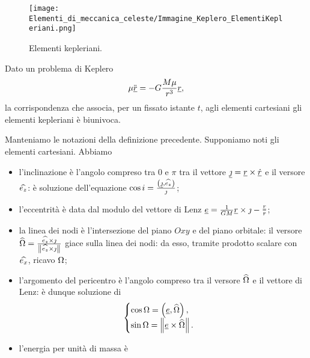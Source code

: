 \begin{figure}
	\texttt{[image: Elementi\_di\_meccanica\_celeste/Immagine\_Keplero\_ElementiKepleriani.png]}
	\centering
	\caption{Elementi kepleriani.}
\end{figure}
\begin{Theorem}
  Dato un problema di Keplero
	\[
		\mu \ddot{\underline{r}}
    = - G \frac{M\mu}{r^3}\underline{r},
	\]
  la corrispondenza che associa, per un fissato istante $t$, agli
  elementi cartesiani gli elementi kepleriani \`e biunivoca.
\end{Theorem}
\Proof Manteniamo le notazioni della definizione precedente.
Supponiamo noti gli elementi cartesiani.
Abbiamo
\begin{itemize}
  \item l'inclinazione \`e l'angolo compreso tra $0$ e $\pi$ tra il
    vettore
    $\underline{\jmath}
      = \underline{r} \times \underline{\dot{r}}$ e il versore
    $\widehat{e_z}$: \`e soluzione dell'equazione
    $\cos{i}
      =\frac{\left ( \underline{\jmath} , \widehat{e_z} \right )}
        {\jmath}$;
  \item l'eccentrit\`a \`e data dal modulo del vettore di Lenz
    $\underline{e}
      = \frac{1}
        {GM}
        \underline{r} \times \jmath
        - \frac{\underline{r}}{r}$;
  \item la linea dei nodi \`e l'intersezione del piano $Oxy$ e del piano
    orbitale: il versore
    $\ver{\LongitudeOfAscendingNode}
      = \frac{\VectorProduct{\ver{e_z}}{\AngularMomentPerUnitMass}}
        {\Norm{\VectorProduct{\ver{e_z}}{\AngularMomentPerUnitMass}}}$
    giace sulla linea dei nodi: da esso, tramite prodotto scalare con
    $\widehat{e_x}$, ricavo $\Omega$;
  \item l'argomento del pericentro \`e l'angolo compreso tra il versore
    $\widehat{\Omega}$ e il vettore di Lenz: \`e dunque
    soluzione di
    \[
      \begin{cases}
        \cos{\LongitudeOfAscendingNode}
          = \ScalarProduct{\vec{\LenzVector}}
            {\ver{\LongitudeOfAscendingNode}},\\
        \sin{\LongitudeOfAscendingNode}
          = \Norm{\VectorProduct{\vec{\LenzVector}}
            {\ver{\LongitudeOfAscendingNode}}}.
      \end{cases}
    \]
  \item l'energia per unit\`a di massa \`e

\end{itemize}
